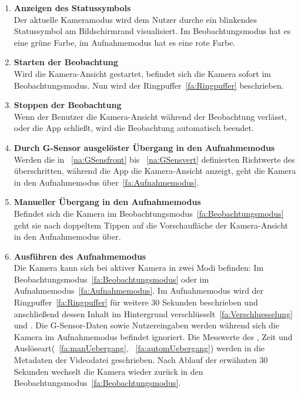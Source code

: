 \begin{enumerate}
\item \label{fa:Statussymbol}\textbf{Anzeigen des Statussymbols} \hfill \\
Der aktuelle Kameramodus wird dem Nutzer durche ein blinkendes Statussymbol am Bildschirmrand visualisiert. Im Beobachtungsmodus hat es eine grüne Farbe, im Aufnahmemodus hat es eine rote Farbe.

\item \label{fa:camStart}\textbf{Starten der Beobachtung} \hfill \\
Wird die Kamera-Ansicht gestartet, befindet sich die Kamera sofort im Beobachtungsmodus. Nun wird der \gls{Ringpuffer}~\eqref{fa:Ringpuffer} beschrieben.

\item \textbf{Stoppen der Beobachtung} \hfill \\
Wenn der Benutzer die Kamera-Ansicht während der Beobachtung verlässt, oder die \gls{App} schließt, wird die Beobachtung automatisch beendet.

\item \label{fa:automUebergang}\textbf{Durch \gls{G-Sensor} ausgelöster Übergang in den Aufnahmemodus} \hfill \\
Werden die in ~\eqref{na:GSensfront} bis ~\eqref{na:GSensvert} definierten Richtwerte des  überschritten, während die \gls{App} die Kamera-Ansicht anzeigt, geht die Kamera in den Aufnahmemodus über~\eqref{fa:Aufnahmemodus}. 

\item \label{fa:manUebergang}\textbf{Manueller Übergang in den Aufnahmemodus} \hfill \\
Befindet sich die Kamera im Beobachtungsmodus~\eqref{fa:Beobachtungsmodus} geht sie nach doppeltem Tippen auf die Vorschaufläche der Kamera-Ansicht in den Aufnahmemodus über.

\item \label{fa:Aufnahmemodus}\textbf{Ausführen des Aufnahmemodus} \hfill \\
Die Kamera kann sich bei aktiver Kamera in zwei Modi befinden: Im Beobachtungsmodus~\eqref{fa:Beobachtungsmodus} oder im Aufnahmemodus~\eqref{fa:Aufnahmemodus}.
Im Aufnahmemodus wird der \gls{Ringpuffer}~\eqref{fa:Ringpuffer} für weitere 30 Sekunden beschrieben und anschließend dessen Inhalt im Hintergrund verschlüsselt~\eqref{fa:Verschluesselung} und . Die \gls{G-Sensor}-Daten sowie Nutzereingaben werden während sich die Kamera im Aufnahmemodus befindet ignoriert. Die Messwerte des , Zeit und Auslöseart(~\eqref{fa:manUebergang}, ~\eqref{fa:automUebergang}) werden in die \gls{Metadaten} der Videodatei geschrieben. Nach Ablauf der erwähnten 30 Sekunden wechselt die Kamera wieder zurück in den Beobachtungsmodus~\eqref{fa:Beobachtungsmodus}.


\end{enumerate}
